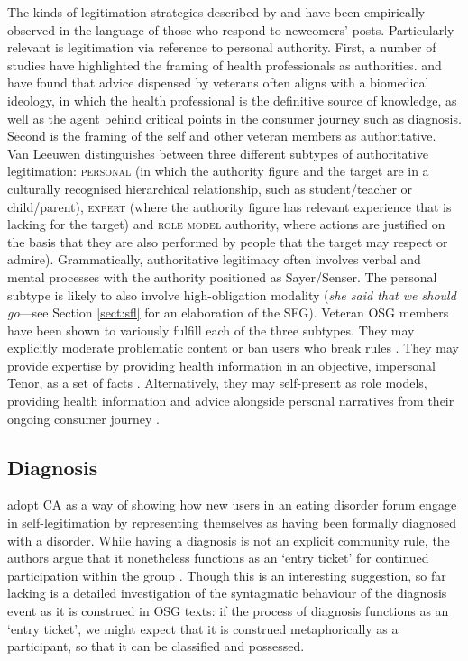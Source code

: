 \documentclass{article}
\renewcommand{\cite}{\parencite}
\begin{document}
The kinds of legitimation strategies described by \textcite{van_leeuwen_legitimation_2007} and \textcite{reyes_strategies_2011} have been empirically observed in the language of those who respond to newcomers' posts. Particularly relevant is legitimation via reference to personal authority. First, a number of studies have highlighted the framing of health professionals as authorities. \textcite{smithson_problem_2011} and \textcite{vayreda_social_2009} have found that advice dispensed by veterans often aligns with a biomedical ideology, in which the health professional is the definitive source of knowledge, as well as the agent behind critical points in the consumer journey such as diagnosis. Second is the framing of the self and other veteran members as authoritative. Van Leeuwen distinguishes between three different subtypes of authoritative legitimation: \textsc{personal} (in which the authority figure and the target are in a culturally recognised hierarchical relationship, such as student\slash teacher or child\slash parent), \textsc{expert} (where the authority figure has relevant experience that is lacking for the target) and \textsc{role model} authority, where actions are justified on the basis that they are also performed by people that the target may respect or admire). Grammatically, authoritative legitimacy often involves verbal and mental processes with the authority positioned as Sayer\slash Senser. The personal subtype is likely to also involve high-obligation modality (\emph{she said that we should go}---see Section \ref{sect:sfl} for an elaboration of the SFG). Veteran OSG members have been shown to variously fulfill each of the three subtypes. They may explicitly moderate problematic content or ban users who break rules \cite{weber_missed_2011}. They may provide expertise by providing health information in an objective, impersonal Tenor, as a set of facts \cite{kaufman2016producing}. Alternatively, they may self-present as role models, providing health information and advice alongside personal narratives from their ongoing consumer journey \cite{koteyko2015performing}.

\subsection{Diagnosis}

\textcite{stommel_use_2011} adopt CA as a way of showing how new users in an eating disorder forum engage in self-legitimation by representing themselves as having been formally diagnosed with a disorder. While having a diagnosis is not an explicit community rule, the authors argue that it nonetheless functions as an `entry ticket' for continued participation within the group \parencite*[p.~6]{stommel_use_2011}. Though this is an interesting suggestion, so far lacking is a detailed investigation of the syntagmatic behaviour of the diagnosis event as it is construed in OSG texts: if the process of diagnosis functions as an `entry ticket', we might expect that it is construed metaphorically as a participant, so that it can be classified and possessed.
\end{document}
